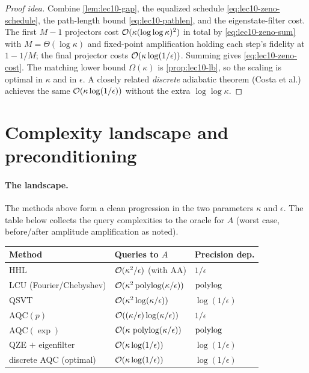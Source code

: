 \begin{proof}[Proof idea]
Combine \cref{lem:lec10-gap}, the equalized schedule \eqref{eq:lec10-zeno-schedule}, the
path-length bound \eqref{eq:lec10-pathlen}, and the eigenstate-filter cost. The first
$M-1$ projectors cost $\mathcal{O}(\kappa(\log\log\kappa)^2)$ in total by
\eqref{eq:lec10-zeno-sum} with $M=\Theta(\log\kappa)$ and fixed-point amplification
holding each step's fidelity at $1-1/M$; the final projector costs
$\mathcal{O}(\kappa\log(1/\epsilon))$. Summing gives \eqref{eq:lec10-zeno-cost}. The matching
lower bound $\Omega(\kappa)$ is \cref{prop:lec10-lb}, so the scaling is optimal in
$\kappa$ and in $\epsilon$. A closely related \emph{discrete} adiabatic theorem
(Costa et al.) achieves the same $\mathcal{O}(\kappa\log(1/\epsilon))$ without the extra
$\log\log\kappa$.
\end{proof}

\section{Complexity landscape and preconditioning}
\label{sec:lec10-5}

\paragraph{The landscape.}
The methods above form a clean progression in the two parameters $\kappa$ and
$\epsilon$. The table below collects the query complexities to the oracle
for $A$ (worst case, before/after amplitude amplification as noted).

\begin{center}
\renewcommand{\arraystretch}{1.3}
\begin{tabular}{@{}lll@{}}
\hline
\textbf{Method} & \textbf{Queries to $A$} & \textbf{Precision dep.}\\
\hline
HHL & $\mathcal{O}(\kappa^2/\epsilon)$ (with AA) & $1/\epsilon$\\
LCU (Fourier/Chebyshev) & $\mathcal{O}(\kappa^2\operatorname{polylog}(\kappa/\epsilon))$ & $\operatorname{polylog}$\\
QSVT & $\mathcal{O}(\kappa^2\log(\kappa/\epsilon))$ & $\log(1/\epsilon)$\\
$\mathrm{AQC}(p)$ & $\mathcal{O}((\kappa/\epsilon)\log(\kappa/\epsilon))$ & $1/\epsilon$\\
$\mathrm{AQC}(\exp)$ & $\mathcal{O}(\kappa\,\operatorname{polylog}(\kappa/\epsilon))$ & $\operatorname{polylog}$\\
QZE $+$ eigenfilter & $\mathcal{O}(\kappa\log(1/\epsilon))$ & $\log(1/\epsilon)$\\
discrete AQC (optimal) & $\mathcal{O}(\kappa\log(1/\epsilon))$ & $\log(1/\epsilon)$\\
\hline
\end{tabular}
\end{center}

